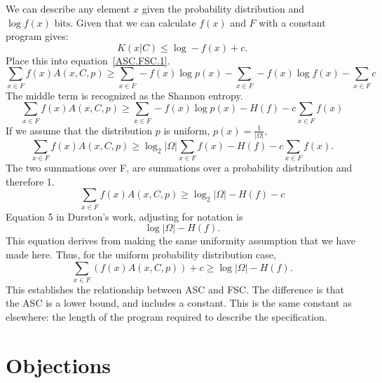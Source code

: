 We can describe any element $x$ given the probability distribution and $\log f(x) \mbox{ bits}$.
Given that we can calculate $f(x)$ and $F$ with a constant program gives:
\begin{equation}
    K(x|C) \leq \log -f(x) + c  \mbox{.}
\end{equation}
Place this into equation~\ref{ASC.FSC.1}.
\begin{equation}
    \sum_{x \in F} f(x) A(x,C,p) 
    \geq \sum_{x \in F} -f(x)\log p(x) - \sum_{x \in F} - f(x) \log f(x) - \sum_{x \in F} c
\end{equation}
The middle term is recognized as the Shannon entropy.
\begin{equation}
    \sum_{x \in F} f(x) A(x,C,p) 
    \geq \sum_{x \in F} -f(x) \log p(x) - H(f) - c \sum_{x \in F} f(x)
\end{equation}
If we assume that the distribution $p$ is uniform, $p(x) = \frac{1}{|\Omega|}$,
\begin{equation}
    \sum_{x \in F} f(x) A(x,C,p) 
    \geq \log_2 |\Omega| \sum_{x \in F} f(x) - H(f) - c \sum_{x \in F} f(x)  \mbox{.}
\end{equation}
The two summations over F, are summations over a probability distribution and therefore 1.
\begin{equation}
    \sum_{x \in F} f(x) A(x,C,p) 
    \geq \log_2 |\Omega| - H(f) - c 
\end{equation}
Equation 5 in Durston's work, adjusting for notation is
\begin{equation}
    \log |\Omega| - H(f)  \mbox{.}
\end{equation}
This equation derives from making the same uniformity assumption that we have made here.
Thus, for the uniform probability distribution case,
\begin{equation}
    \sum_{x \in F} (f(x) A(x,C,p) ) + c
    \geq \log |\Omega| - H(f)  \mbox{.}
\end{equation}
This establishes the relationship between ASC and FSC.
The difference is that the ASC is a lower bound, and includes a constant.
This is the same constant as elsewhere: the length of the program required to describe the specification.

\section{Objections}

